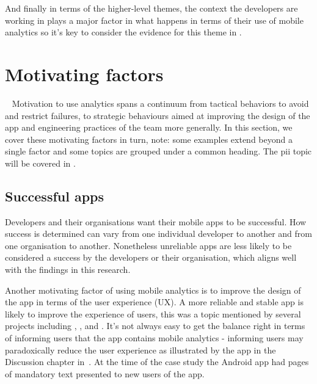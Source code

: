 And finally in terms of the higher-level themes, the context the developers are working in plays a major factor in what happens in terms of their use of mobile analytics so it's key to consider the evidence for this theme in .


\section{Motivating factors}~\label{aiu-motivating-factors-theme}
Motivation to use analytics spans a continuum from tactical behaviors to avoid and restrict failures, to strategic behaviours aimed at improving the design of the app and engineering practices of the team more generally.  In this section, we cover these motivating factors in turn, note: some examples extend beyond a single factor and some topics are grouped under a common heading. The \Gls{pii} topic will be covered in .

\subsection{Successful apps}\label{successful-apps-topic}
Developers and their organisations want their mobile apps to be successful. How success is determined can vary from one individual developer to another and from one organisation to another. Nonetheless unreliable apps are less likely to be considered a success by the developers or their organisation, which aligns well with the findings in this research.

Another motivating factor of using mobile analytics is to improve the design of the app in terms of the user experience (UX). A more reliable and stable app is likely to improve the experience of users, this was a topic mentioned by several projects including , , and . It's not always easy to get the balance right in terms of informing users that the app contains mobile analytics - informing users may paradoxically reduce the user experience as illustrated by the  app in the Discussion chapter in~. At the time of the case study the Android app had pages of mandatory text presented to new users of the app.

